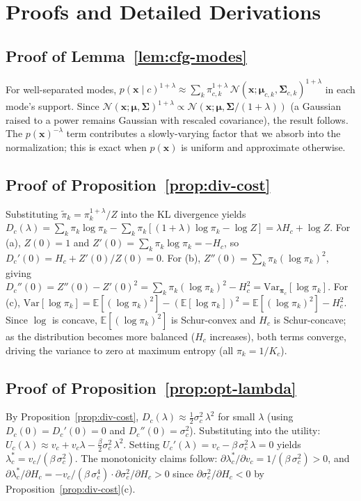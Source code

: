 \section{Proofs and Detailed Derivations}
\label{sec:theory-proofs}

\subsection{Proof of Lemma~\ref{lem:cfg-modes}}
For well-separated modes, $p(\mathbf{x}\mid c)^{1+\lambda} \approx \sum_k \pi_{c,k}^{1+\lambda}\,\mathcal{N}(\mathbf{x};\boldsymbol{\mu}_{c,k},\boldsymbol{\Sigma}_{c,k})^{1+\lambda}$ in each mode's support. Since $\mathcal{N}(\mathbf{x};\boldsymbol{\mu},\boldsymbol{\Sigma})^{1+\lambda} \propto \mathcal{N}(\mathbf{x};\boldsymbol{\mu},\boldsymbol{\Sigma}/(1+\lambda))$ (a Gaussian raised to a power remains Gaussian with rescaled covariance), the result follows. The $p(\mathbf{x})^{-\lambda}$ term contributes a slowly-varying factor that we absorb into the normalization; this is exact when $p(\mathbf{x})$ is uniform and approximate otherwise.

\subsection{Proof of Proposition~\ref{prop:div-cost}}
Substituting $\tilde{\pi}_k = \pi_k^{1+\lambda}/Z$ into the KL divergence yields $D_c(\lambda) = \sum_k \pi_k \log\pi_k - \sum_k \pi_k[(1{+}\lambda)\log\pi_k - \log Z] = \lambda H_c + \log Z$. For (a), $Z(0) = 1$ and $Z'(0) = \sum_k \pi_k \log\pi_k = -H_c$, so $D_c'(0) = H_c + Z'(0)/Z(0) = 0$. For (b), $Z''(0) = \sum_k \pi_k(\log\pi_k)^2$, giving $D_c''(0) = Z''(0) - Z'(0)^2 = \sum_k \pi_k(\log\pi_k)^2 - H_c^2 = \mathrm{Var}_{\boldsymbol{\pi}_c}[\log\pi_k]$. For (c), $\mathrm{Var}[\log\pi_k] = \mathbb{E}[(\log\pi_k)^2] - (\mathbb{E}[\log\pi_k])^2 = \mathbb{E}[(\log\pi_k)^2] - H_c^2$. Since $\log$ is concave, $\mathbb{E}[(\log\pi_k)^2]$ is Schur-convex and $H_c$ is Schur-concave; as the distribution becomes more balanced ($H_c$ increases), both terms converge, driving the variance to zero at maximum entropy (all $\pi_k = 1/K_c$).

\subsection{Proof of Proposition~\ref{prop:opt-lambda}}
By Proposition~\ref{prop:div-cost}, $D_c(\lambda) \approx \frac{1}{2}\sigma_c^2\,\lambda^2$ for small $\lambda$ (using $D_c(0) = D_c'(0) = 0$ and $D_c''(0) = \sigma_c^2$). Substituting into the utility: $U_c(\lambda) \approx v_c + v_c\lambda - \frac{\beta}{2}\sigma_c^2\,\lambda^2$. Setting $U_c'(\lambda) = v_c - \beta\,\sigma_c^2\,\lambda = 0$ yields $\lambda_c^* = v_c / (\beta\,\sigma_c^2)$. The monotonicity claims follow: $\partial\lambda_c^*/\partial v_c = 1/(\beta\,\sigma_c^2) > 0$, and $\partial\lambda_c^*/\partial H_c = -v_c/(\beta\,\sigma_c^4)\cdot\partial\sigma_c^2/\partial H_c > 0$ since $\partial\sigma_c^2/\partial H_c < 0$ by Proposition~\ref{prop:div-cost}(c).

